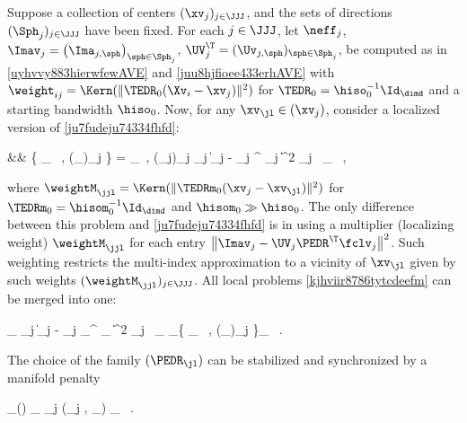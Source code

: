 Suppose a collection of centers \( ( \xv_{j} )_{j \in \JJJ} \), and 
the sets of directions \( (\Sph_{j})_{j \in \JJJ} \) have been fixed.
% 
For each \( j \in \JJJ \), let \( \neff_{j} \),
\( \Imav_{j} = \bigl( \Ima_{j,\sph} \bigr)_{\sph \in \Sph_{j}} \),
\( \UV_{j}^{\T} = (\Uv_{j,\sph})_{\sph \in \Sph_{j}} \),
be computed as in \eqref{uyhvvy883hierwfewAVE} and \eqref{juu8hjfioee433erhAVE} with 
\( \weight_{ij} = \Kern(\| \TEDR_{0} (\Xv_{i} - \xv_{j}) \|^{2}) \)
for \( \TEDR_{0} = \hiso_{0}^{-1} \Id_{\dimd} \) and a starting bandwidth \( \hiso_{0} \).
%
Now, for any \( \xv_{\jl} \in (\xv_{j}) \), consider a localized version of
\eqref{ju7fudeju74334fhfd}:
\begin{EQA}[rcl]
	&& \nquad
	\bigl\{ \PEDR_{\jl} \, , (\fclv_{\jjl})_{j \in \JJJ} \bigr\}
	= 
	\arginf_{\PEDR \, , (\fclv_{j})_{j \in \JJJ}} 
	\sum_{j \in \JJJ} 
	\bigl\| \Imav_{j} - \UV_{j} \PEDR^{\T} \fclv_{j} \bigr\|^{2} \neff_{j} \,
	\weightM_{\jjl}
	\, ,
	\qquad \quad
\label{kjhviir8786tytcdeefm}
\end{EQA}
where \( \weightM_{\jjl} = \Kern(\| \TEDRm_{0} (\xv_{j} - \xv_{\jl}) \|^{2}) \) for
\( \TEDRm_{0} = \hisom_{0}^{-1} \Id_{\dimd} \) and \( \hisom_{0} \gg \hiso_{0} \).
The only difference between this problem and \eqref{ju7fudeju74334fhfd} is in using a multiplier (localizing weight)
\( \weightM_{\jjl} \)
for each entry \( \bigl\| \Imav_{j} - \UV_{j} \PEDR^{\T} \fclv_{j} \bigr\|^{2} \).
Such weighting restricts the multi-index approximation to a vicinity of \( \xv_{\jl} \) given by 
such weights \( (\weightM_{\jjl})_{j \in \JJJ} \). 
All local problems \eqref{kjhviir8786tytcdeefm} can be merged into one:
\begin{EQA}[c]
	\sum_{\jl \in \JJJ} \sum_{j \in \JJJ}
	\bigl\| \Imav_{j} - \UV_{j} \PEDR_{\jl}^{\T} \fclv_{\jjl} \bigr\|^{2} \neff_{j} \, \weightM_{\jjl}
	\to 
	\inf_{\{ \PEDR_{\jl} \, , (\fclv_{\jjl})_{j \in \JJJ} \}_{\jl \in \JJJ}}
	\, .
	\qquad \quad
\label{kjhviir8786tytcdeefde}
\end{EQA}
%
The choice of the family \( (\PEDR_{\jl}) \) can be stabilized and synchronized by a manifold penalty
\begin{EQA}[c]
	\pent_{\subM}(\PEDR)
	\eqdef
	\lambda \sum_{\jl \in \JJJ} \sum_{j \in \JJJ} \epsilon(\PEDR_{j} , \PEDR_{\jl})
	\; \weightM_{\jjl}
	\, .
\end{EQA}
